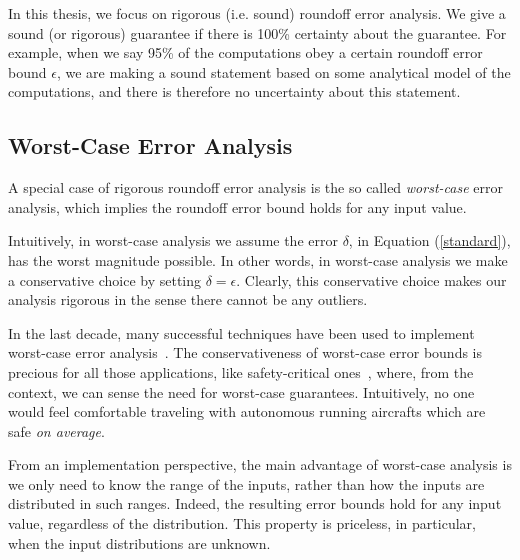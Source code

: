 In this thesis, we focus on rigorous (i.e. sound) roundoff error analysis.
%
We give a sound (or rigorous) guarantee if there is 100\% certainty about the guarantee.
%
%
For example, when we say 95\% of the computations obey a certain roundoff error bound $\epsilon$, we are making a sound statement based on some analytical model of the computations, and there is therefore no uncertainty about this statement.
%
%
\subsection{Worst-Case Error Analysis}
\label{sec:worst}
%
A special case of rigorous roundoff error analysis is the so called \emph{worst-case} error analysis, which implies the roundoff error bound holds for any input value.
%

Intuitively, in worst-case analysis we assume the error $\delta$, in Equation (\ref{standard}), has the worst magnitude possible. In other words, in worst-case analysis we make a conservative choice by setting $\delta=\epsilon$.
%
Clearly, this conservative choice makes our analysis rigorous in the sense there cannot be any outliers.
%

In the last decade, many successful techniques have been used to implement worst-case error analysis~\cite{darulova2018daisy,2015_fm_sjrg,solovyev2018rigorous,rosa,fptuner,smartfloat,satire,gappa,fluctuat}.
%
%
The conservativeness of worst-case error bounds is precious for all those applications, like safety-critical ones~\cite{guardstable, cpralg}, where, from the context, we can sense the need for worst-case guarantees.
%
Intuitively, no one would feel comfortable traveling with autonomous running aircrafts which are safe \emph{on average}.

%
From an implementation perspective, the main advantage of worst-case analysis is we only need to know the range of the inputs, rather than how the inputs are distributed in such ranges. 
%
Indeed, the resulting error bounds hold for any input value, regardless of the distribution.
%
%
This property is priceless, in particular, when the input distributions are unknown.
%

